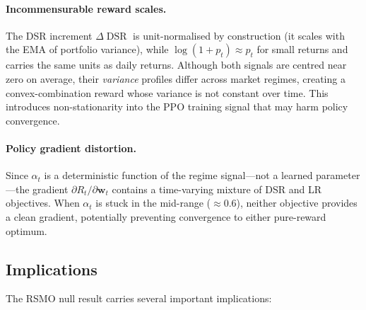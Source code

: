 \documentclass[conference]{IEEEtran}
\begin{document}
\paragraph{Incommensurable reward scales.}
The DSR increment $\Delta\!\operatorname{DSR}$ is unit-normalised by
construction (it scales with the EMA of portfolio variance), while
$\log(1+p_t) \approx p_t$ for small returns and carries the same units
as daily returns. Although both signals are centred near zero on
average, their \emph{variance} profiles differ across market regimes,
creating a convex-combination reward whose variance is not constant
over time. This introduces non-stationarity into the PPO training
signal that may harm policy convergence.

\paragraph{Policy gradient distortion.}
Since $\alpha_t$ is a deterministic function of the regime signal—not
a learned parameter—the gradient $\partial R_t / \partial \mathbf{w}_t$
contains a time-varying mixture of DSR and LR objectives. When
$\alpha_t$ is stuck in the mid-range ($\approx 0.6$), neither objective
provides a clean gradient, potentially preventing convergence to either
pure-reward optimum.

\subsection{Implications}
\label{sec:rsmo_impl}

The RSMO null result carries several important implications:
\end{document}
